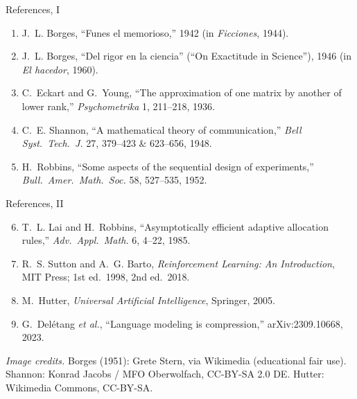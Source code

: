 
\begin{frame}{References, I}
  \footnotesize
  \setlength{\itemsep}{0.4em}
  \begin{enumerate}
    \item J.~L. Borges, ``Funes el memorioso,'' 1942 (in \textit{Ficciones}, 1944).
    \item J.~L. Borges, ``Del rigor en la ciencia'' (``On Exactitude in Science''), 1946 (in \textit{El hacedor}, 1960).
    \item C.~Eckart and G.~Young, ``The approximation of one matrix by another of lower rank,'' \textit{Psychometrika} 1, 211--218, 1936.
    \item C.~E. Shannon, ``A mathematical theory of communication,'' \textit{Bell Syst.\ Tech.\ J.} 27, 379--423 \& 623--656, 1948.
    \item H.~Robbins, ``Some aspects of the sequential design of experiments,'' \textit{Bull.\ Amer.\ Math.\ Soc.} 58, 527--535, 1952.
  \end{enumerate}
\end{frame}

\begin{frame}{References, II}
  \footnotesize
  \setlength{\itemsep}{0.4em}
  \begin{enumerate}
    \setcounter{enumi}{5}
    \item T.~L. Lai and H.~Robbins, ``Asymptotically efficient adaptive allocation rules,'' \textit{Adv.\ Appl.\ Math.} 6, 4--22, 1985.
    \item R.~S. Sutton and A.~G. Barto, \textit{Reinforcement Learning: An Introduction}, MIT Press; 1st ed.\ 1998, 2nd ed.\ 2018.
    \item M.~Hutter, \textit{Universal Artificial Intelligence}, Springer, 2005.
    \item G.~Del\'etang \textit{et al.}, ``Language modeling is compression,'' arXiv:2309.10668, 2023.
  \end{enumerate}

  \vspace{0.8em}
  {\scriptsize\color{mutedWarmGray}\textit{Image credits.} Borges (1951): Grete Stern, via Wikimedia (educational fair use). Shannon: Konrad Jacobs / MFO Oberwolfach, CC-BY-SA 2.0 DE. Hutter: Wikimedia Commons, CC-BY-SA.}
\end{frame}
